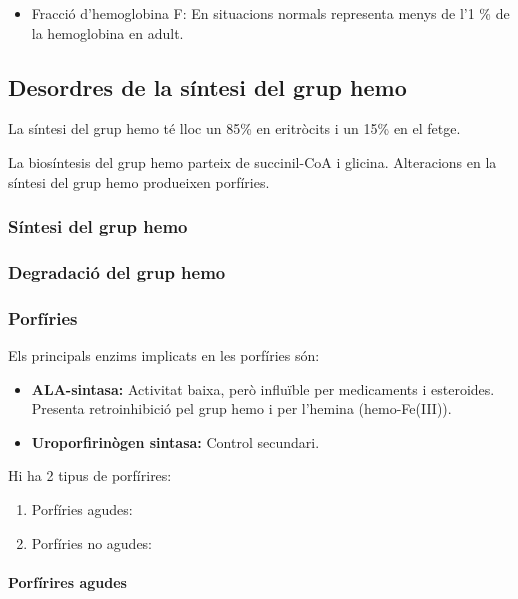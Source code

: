 \begin{itemize}
\begin{itemize}
\item Fracció d'hemoglobina F: En situacions normals representa menys
  de l'1 \% de la hemoglobina en adult.


\end{itemize}


\subsection{Desordres de la síntesi del grup hemo}
La síntesi del grup hemo té lloc un 85\% en eritròcits i un 15\% en el
fetge.

La biosíntesis del grup hemo parteix de succinil-CoA i
glicina. Alteracions en la síntesi del grup hemo produeixen porfíries.

\subsubsection*{Síntesi del grup hemo}

\subsubsection*{Degradació del grup hemo}

\subsubsection{Porfíries}
Els principals enzims implicats en les porfíries són:
\begin{itemize}
\item \textbf{ALA-sintasa:} Activitat baixa, però influïble per medicaments i esteroides. Presenta retroinhibició pel grup hemo i per l’hemina (hemo-Fe(III)).

\item \textbf{Uroporfirinògen sintasa:} Control secundari.
\end{itemize}

Hi ha 2 tipus de porfírires:
\begin{enumerate}
\item Porfíries agudes:

\item Porfíries no agudes:
\end{enumerate}

\paragraph{Porfírires agudes} \hfill \\


\end{itemize}
